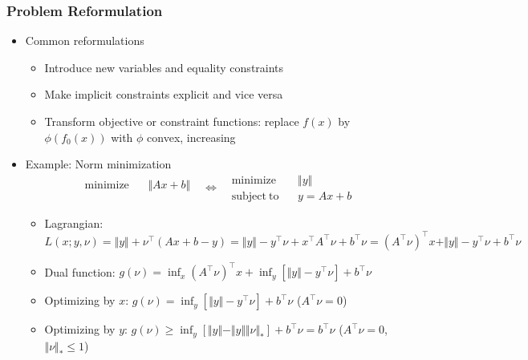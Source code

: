\subsubsection*{Problem Reformulation}
\begin{itemize}
    \item Common reformulations
    \begin{itemize}
        \item Introduce new variables and equality constraints
        \item Make implicit constraints explicit and vice versa
        \item Transform objective or constraint functions: replace $f(x)$ by $\phi(f_0(x))$ with $\phi$ convex, increasing
    \end{itemize}
    \item Example: Norm minimization
    \begin{equation}\begin{aligned}
        \mathrm{minimize}~~&~~\Vert Ax+b \Vert \\ {}
    \end{aligned}~~~\Leftrightarrow~~~\begin{aligned}
        \mathrm{minimize}~~&~~\Vert y\Vert \\
        \mathrm{subject~to}~~&~~y = Ax + b
    \end{aligned}\end{equation}
    \begin{itemize}
        \item Lagrangian: $L(x;y,\nu) = \Vert y\Vert+\nu^{\top}(Ax+b-y) = \Vert y\Vert-y^{\top}\nu+x^{\top}A^{\top}\nu+b^{\top}\nu = (A^{\top}\nu)^{\top}x + \Vert y\Vert - y^{\top}\nu + b^{\top}\nu$
        \item Dual function: $g(\nu) = \inf_{x}(A^{\top}\nu)^{\top}x + \inf_{y}\left[\Vert y\Vert - y^{\top}\nu\right] + b^{\top}\nu$
        \item Optimizing by $x$: $g(\nu) = \inf_{y}\left[\Vert y\Vert - y^{\top}\nu\right] + b^{\top}\nu$ ($A^{\top}\nu = 0$)
        \item Optimizing by $y$: $g(\nu)\geq\inf_{y}\left[\Vert y\Vert - \Vert y\Vert\Vert\nu\Vert_\ast\right]+b^{\top}\nu = b^{\top}\nu$ ($A^{\top}\nu = 0$, $\Vert\nu\Vert_\ast\leq 1$)
    \end{itemize}
\end{itemize}
